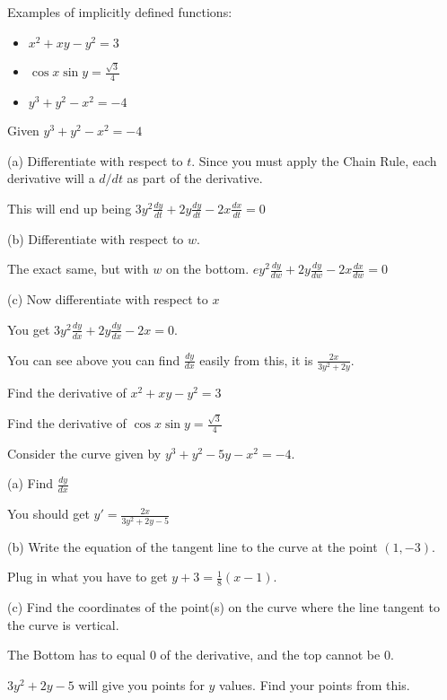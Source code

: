 \documentclass[../bccalc.tex]{subfiles}
\begin{document}
Examples of implicitly defined functions:
\begin{itemize}
    \item $x^2+xy-y^2=3$
    \item $\cos x\sin y=\frac{\sqrt{3}}{4}$
    \item $y^3+y^2-x^2=-4$
\end{itemize}

\begin{example}
    Given $y^3+y^2-x^2=-4$

    (a) Differentiate with respect to $t$. Since you must apply the Chain Rule, each derivative will a $d/dt$ as part of the derivative.

    This will end up being $3y^2\frac{dy}{dt}+2y\frac{dy}{dt}-2x\frac{dx}{dt}=0$

    (b) Differentiate with respect to $w$.

    The exact same, but with $w$ on the bottom. $ey^2\frac{dy}{dw}+2y\frac{dy}{dw}-2x\frac{dx}{dw}=0$

    (c) Now differentiate with respect to $x$

    You get $3y^2\frac{dy}{dx}+2y\frac{dy}{dx}-2x=0$.
\end{example}

You can see above you can find $\frac{dy}{dx}$ easily from this, it is $\frac{2x}{3y^2+2y}$.

\ex Find the derivative of $x^2+xy-y^2=3$

\ex Find the derivative of $\cos x\sin y=\frac{\sqrt{3}}{4}$

\begin{example}
    Consider the curve given by $y^3+y^2-5y-x^2=-4$.

    (a) Find $\frac{dy}{dx}$

    You should get $y'=\frac{2x}{3y^2+2y-5}$

    (b) Write the equation of the tangent line to the curve at the point $(1,-3)$.

    Plug in what you have to get $y+3=\frac{1}{8}(x-1)$.

    (c) Find the coordinates of the point(s) on the curve where the line tangent to the curve is vertical.

    The Bottom has to equal 0 of the derivative, and the top cannot be 0.

    $3y^2+2y-5$ will give you points for $y$ values. Find your points from this.
\end{example}
\end{document}
